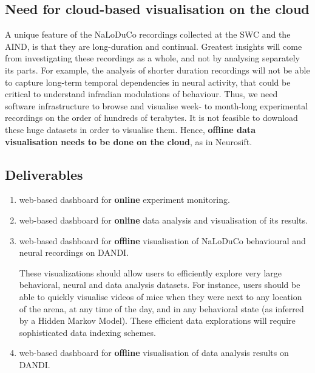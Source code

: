 
\subsection{Need for cloud-based visualisation on the cloud}

A unique feature of the NaLoDuCo recordings collected at the SWC and the AIND,
is that they are long-duration and continual. Greatest insights will come from
investigating these recordings as a whole, and not by analysing separately its
parts. For example, the analysis of shorter duration recordings will not be
able to capture long-term temporal dependencies in neural activity, that could
be critical to understand infradian modulations of behaviour. Thus, we need
software infrastructure to browse and visualise week- to month-long
experimental recordings on the order of hundreds of terabytes. It is not
feasible to download these huge datasets in order to visualise them. Hence,
\textbf{offline data visualisation needs to be done on the cloud}, as in Neurosift.

\subsection{Deliverables}

\begin{enumerate}

    \item web-based dashboard for \textbf{online} experiment monitoring.

    \item web-based dashboard for \textbf{online} data analysis and
    visualisation of its results.

    \item web-based dashboard for \textbf{offline} visualisation of NaLoDuCo
    behavioural and neural recordings on DANDI.

    These visualizations should allow users to efficiently explore very large
    behavioral, neural and data analysis datasets. For instance, users should
    be able to quickly visualise videos of mice when they were next to any
    location of the arena, at any time of the day, and in any behavioral state
    (as inferred by a Hidden Markov Model). These efficient data explorations
    will require sophisticated data indexing schemes.

    \item web-based dashboard for \textbf{offline} visualisation of data analysis
    results on DANDI.

\end{enumerate}


